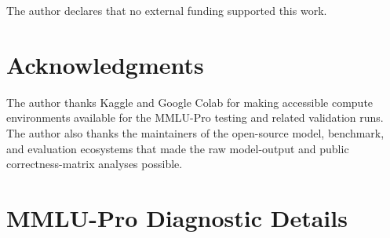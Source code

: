 \documentclass[manuscript, screen, review, nonacm]{jair}
\begin{document}
The author declares that no external funding supported this work.

\section{Acknowledgments}

The author thanks Kaggle and Google Colab for making accessible compute environments available for the MMLU-Pro testing and related validation runs. The author also thanks the maintainers of the open-source model, benchmark, and evaluation ecosystems that made the raw model-output and public correctness-matrix analyses possible.

\printbibliography

\appendix

\section{MMLU-Pro Diagnostic Details}

\begin{table}[H]
\centering
\small
\resizebox{\linewidth}{!}{}
\caption{Answer-source coverage by family. Saved predictions are used when present; otherwise explicit answer markers and fallback letter rules are applied to raw responses.}
\label{tab:extraction-coverage}
\end{table}

\begin{table}[H]
\centering
\small

\caption{Parser-validation status for the archived MMLU-Pro raw-output diagnostic. Manual labels are required before reporting parser agreement as a validation result.}
\label{tab:parser-validation-status}
\end{table}

\begin{table}[H]
\centering
\small
\resizebox{\linewidth}{!}{}
\caption{Parser-audit impact gate. The current artifact has generated the sample but has not completed human labels, so MMLU-Pro remains a parser-dependent diagnostic.}
\label{tab:parser-impact}
\end{table}

\begin{table}[H]
\centering
\small
\resizebox{\linewidth}{!}{}
\caption{MMLU-Pro scoring-robustness modes over archived outputs. These are sensitivity analyses, not confirmatory validation while parser labels are incomplete.}
\label{tab:mmlu-scoring-robustness}
\end{table}
\end{document}
